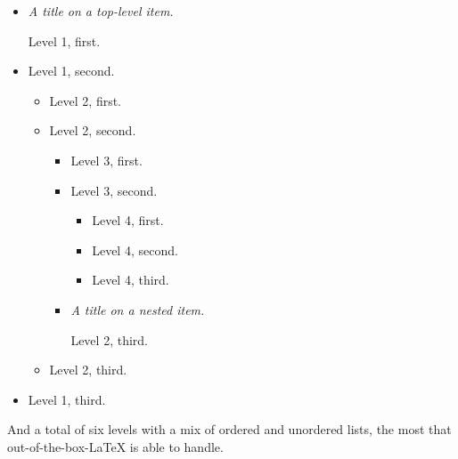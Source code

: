 \documentclass{amsart}
\theoremstyle{plain}%
\theoremstyle{definition}%
\theoremstyle{remark}%
\newcommand{\lititle}[1]{{\slshape#1}}
\numberwithin{equation}{section}
\begin{document}
\begin{itemize}[label=\textbullet]
\item{}\lititle{A title on a top-level item.}\par%
Level 1, first.%
\item{}Level 1, second.%
\begin{itemize}[label=$\circ$]
\item{}Level 2, first.%
\item{}Level 2, second.%
\begin{itemize}[label=$\blacksquare$]
\item{}Level 3, first.%
\item{}Level 3, second.%
\begin{itemize}[label=\textbullet]
\item{}Level 4, first.%
\item{}Level 4, second.%
\item{}Level 4, third.%
\end{itemize}
%
\item{}\lititle{A title on a nested item.}\par%
Level 2, third.%
\end{itemize}
%
\item{}Level 2, third.%
\end{itemize}
%
\item{}Level 1, third.%
\end{itemize}
%
\par
And a total of six levels with a mix of ordered and unordered lists, the most that out-of-the-box-\LaTeX{} is able to handle.%
\end{document}
